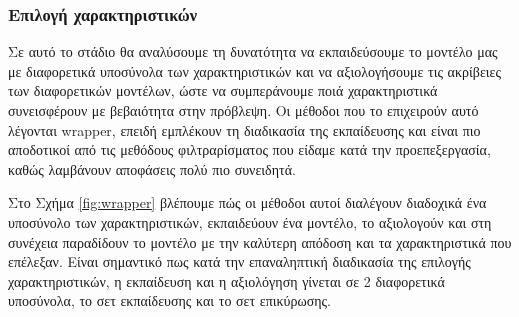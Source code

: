 \subsubsection{Επιλογή χαρακτηριστικών} \label{section:selection}
Σε αυτό το στάδιο θα αναλύσουμε τη δυνατότητα να εκπαιδεύσουμε το μοντέλο μας με διαφορετικά υποσύνολα των χαρακτηριστικών και να αξιολογήσουμε τις ακρίβειες των διαφορετικών μοντέλων, ώστε να συμπεράνουμε ποιά χαρακτηριστικά συνεισφέρουν με βεβαιότητα στην πρόβλεψη. Οι μέθοδοι που το επιχειρούν αυτό λέγονται wrapper, επειδή εμπλέκουν  τη διαδικασία της εκπαίδευσης και είναι πιο αποδοτικοί από τις μεθόδους φιλτραρίσματος που είδαμε κατά την προεπεξεργασία, καθώς λαμβάνουν αποφάσεις πολύ πιο συνειδητά.

Στο Σχήμα \ref{fig:wrapper} βλέπουμε πώς οι μέθοδοι αυτοί διαλέγουν διαδοχικά ένα υποσύνολο των χαρακτηριστικών, εκπαιδεύουν ένα μοντέλο, το αξιολογούν και στη συνέχεια παραδίδουν το μοντέλο με την καλύτερη απόδοση και τα χαρακτηριστικά που επέλεξαν. Είναι σημαντικό πως κατά την επαναληπτική διαδικασία της επιλογής χαρακτηριστικών, η εκπαίδευση και η αξιολόγηση γίνεται σε 2 διαφορετικά υποσύνολα, το σετ εκπαίδευσης και το σετ επικύρωσης.

